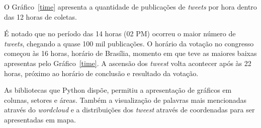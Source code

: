 O Gráfico~\ref{time} apresenta a quantidade de publicações de \textit{tweets} por hora dentro das 12 horas de coletas.

É notado que no período das 14 horas (02 PM) ocorreu o maior número de \textit{tweets}, chegando a quase 100 mil publicações. O horário da votação no congresso começou às 16 horas, horário de Brasília, momento em que teve as maiores baixas apresentas pelo Gráfico~\ref{time}. A ascensão dos \textit{tweest} volta acontecer após às 22 horas, próximo ao horário de conclusão e resultado da votação.

As bibliotecas que Python dispõe, permitiu a apresentação de gráficos em colunas, setores e áreas. Também a visualização de palavras mais mencionadas através do \textit{wordcloud} e a distribuições dos \textit{tweest} através de coordenadas para ser apresentadas em mapa.







